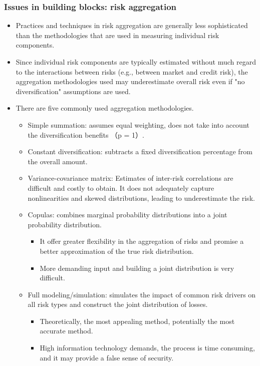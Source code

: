 \subsubsection{Issues in building blocks: risk aggregation}
\begin{itemize}
\item Practices and techniques in risk aggregation are generally less sophisticated than the methodologies that are used in measuring individual risk components.
\item Since individual risk components are typically estimated without much regard to the interactions between risks (e.g., between market and credit risk), the aggregation methodologies used may underestimate overall risk even if "no diversification" assumptions are used.
\item There are five commonly used aggregation methodologies.
    \begin{itemize}
    \item Simple summation: assumes equal weighting, does not
    take into account the diversification benefits （p = 1）.
    \item Constant diversification: subtracts a fixed diversification percentage from the overall amount.
    \item Variance-covariance matrix: Estimates of inter-risk correlations are difficult and costly to obtain. It does not adequately capture nonlinearities and skewed distributions, leading to underestimate the risk.
    \item Copulas: combines marginal probability distributions into a joint probability distribution.
        \begin{itemize}
        \item It offer greater flexibility in the aggregation of risks and promise a better approximation of the true risk distribution.
        \item More demanding input and building a joint distribution is very difficult.
        \end{itemize}
    \item Full modeling/simulation: simulates the impact of common risk drivers on all risk types and construct the joint distribution of losses.
        \begin{itemize}
        \item Theoretically, the most appealing method, potentially the most accurate method.
        \item High information technology demands, the process is time consuming, and it may provide a false sense of security.
        \end{itemize}
    \end{itemize}
\end{itemize}


